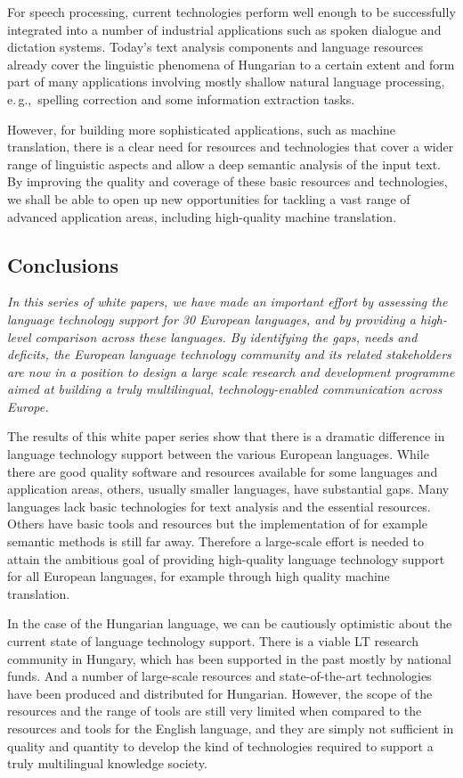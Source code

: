 \begin{multicols}{2}
For speech processing, current technologies perform well enough to be successfully integrated into a number of industrial applications such as spoken dialogue and dictation systems. Today's text analysis components and language resources already cover the linguistic phenomena of Hungarian to a certain extent and form part of many applications involving mostly shallow natural language processing, e.\,g.,~spelling correction and some information extraction tasks.

However, for building more sophisticated applications, such as machine translation, there is a clear need for resources and technologies that cover a wider range of linguistic aspects and allow a deep semantic analysis of the input text. By improving the quality and coverage of these basic resources and technologies, we shall be able to open up new opportunities for tackling a vast range of advanced application areas, including high-quality machine translation.

\subsection{Conclusions}

\emph{In this series of white papers, we have made an important effort by assessing the language technology support for 30 European languages, and by providing a high-level comparison across these languages. By identifying the gaps, needs and deficits, the European language technology community and its related stakeholders are now in a position to design a large scale research and development programme aimed at building a truly multilingual, technology-enabled communication across Europe.}

The results of this white paper series show that there is a dramatic difference in language technology support between the various European languages. While there are good quality software and resources available for some languages and application areas, others, usually smaller languages, have substantial gaps. Many languages lack basic technologies for text analysis and the essential resources. Others have basic tools and resources but the implementation of for example semantic methods is still far away. Therefore a large-scale effort is needed to attain the ambitious goal of providing high-quality language technology support for all European languages, for example through high quality machine translation. 

In the case of the Hungarian language, we can be cautiously optimistic about the current state of language technology support. There is a viable LT research community in Hungary, which has been supported in the past mostly by national funds. And a number of large-scale resources and state-of-the-art technologies have been produced and distributed for Hungarian. However, the scope of the resources and the range of tools are still very limited when compared to the resources and tools for the English language, and they are simply not sufficient in quality and quantity to develop the kind of technologies required to support a truly multilingual knowledge society.


\end{multicols}
